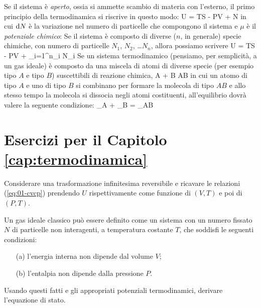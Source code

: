 Se il sistema è {\em aperto}, ossia si ammette scambio di materia con l'esterno, il primo principio della termodinamica si riscrive in questo modo:
\be
\de U = T\de S - P\de V + \mu \de N
\ee
in cui ${\textrm d}N$ è la variazione nel numero di particelle che compongono il sistema e $\mu$ è il {\em potenziale chimico}:
\be
\label{eq:01-mu}
\mu \equiv {}
\ee
Se il sistema è composto di diverse ($n$, in generale) specie chimiche, con numero di particelle $N_1$, $N_2$, \dots $N_n$, allora possiamo scrivere
\be
\de U = T\de S - P\de V + \sum_{i=1}^{n}\mu_i N_i
\ee
Se un sistema termodinamico (pensiamo, per semplicità, a un gas ideale) è composto da una miscela di atomi di diverse specie (per esempio tipo $A$ e tipo $B$) suscettibili di reazione chimica,
\be
A + B \rightleftharpoons AB
\ee
in cui un atomo di tipo $A$ e uno di tipo $B$ si combinano per formare la molecola di tipo $AB$ e allo stesso tempo la molecola si dissocia negli atomi costituenti, all'equilibrio dovrà valere la seguente condizione:
\be
\mu_A + \mu_B = \mu_{AB}
\ee

\newpage
\section{Esercizi per il Capitolo \ref{cap:termodinamica}}
\label{sec:01-esercizi}

\begin{Exercise}[title={$C_V$ e $C_P$}, label={ex:01-cvcp1}]
Considerare una trasformazione infinitesima reversibile e ricavare le relazioni (\ref{eq:01-cvcp}) prendendo $U$ rispettivamente come funzione di $(V,T)$ e poi di $(P,T)$.
\end{Exercise}


\begin{Exercise}[title={Equazione di stato},label={ex:01-PVNkT}]
Un gas ideale classico può essere definito come un sistema con un numero fissato $N$ di particelle non interagenti, a temperatura costante $T$, che soddisfi le seguenti condizioni:
\begin{itemize}
\item[(a)] l'energia interna non dipende dal volume $V$;
\item[(b)] l'entalpia non dipende dalla pressione $P$.
\end{itemize}
Usando questi fatti e gli appropriati potenziali termodinamici, derivare l'equazione di stato.
\end{Exercise}

